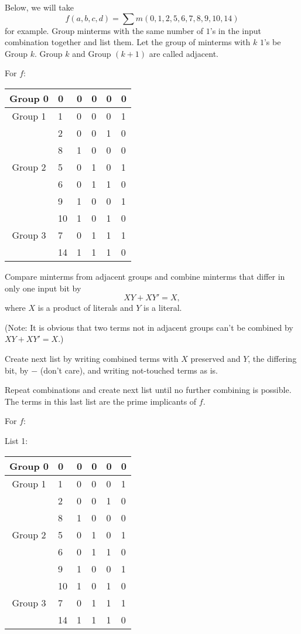\documentclass[a4paper,12pt]{article}
\begin{document}
\begin{itemize}
\begin{itemize}
\begin{itemize}
\begin{itemize}
\begin{itemize}
\begin{itemize}
\begin{itemize}
Below, we will take
\[f(a,b,c,d)=\sum m(0,1,2,5,6,7,8,9,10,14)\]
for example.
Group minterms with the same number of $1$'s in the input combination together and list them. Let the group of minterms with $k$ $1$'s be Group $k$. Group $k$ and Group $(k+1)$ are called adjacent.

For $f$:
\begin{longtable}[c]{|c|m|mmmm|}
\hline
Group 0 & 0 & 0 & 0 & 0 & 0 \\\hline
Group 1 & 1 & 0 & 0 & 0 & 1 \\\cline{2-6}
& 2 & 0 & 0 & 1 & 0 \\\cline{2-6}
& 8 & 1 & 0 & 0 & 0 \\\hline
Group 2 & 5 & 0 & 1 & 0 & 1 \\\cline{2-6}
& 6 & 0 & 1 & 1 & 0 \\\cline{2-6}
& 9 & 1 & 0 & 0 & 1 \\\cline{2-6}
& 10 & 1 & 0 & 1 & 0 \\\hline
Group 3 & 7 & 0 & 1 & 1 & 1 \\\cline{2-6}
& 14 & 1 & 1 & 1 & 0 \\\hline
\end{longtable}
Compare minterms from adjacent groups and combine minterms that differ in only one input bit by
\[XY+XY'=X,\]
where $X$ is a product of literals and $Y$ is a literal.

(Note: It is obvious that two terms not in adjacent groups can't be combined by $XY+XY'=X$.)

Create next list by writing combined terms with $X$ preserved and $Y$, the differing bit, by $-$ (don't care), and writing not-touched terms as is.

Repeat combinations and create next list until no further combining is possible. The terms in this last list are the prime implicants of $f$.

For $f$:

List 1:
\begin{longtable}[c]{|c|m|mmmm|}
\hline
Group 0 & 0 & 0 & 0 & 0 & 0 \\\hline
Group 1 & 1 & 0 & 0 & 0 & 1 \\\cline{2-6}
& 2 & 0 & 0 & 1 & 0 \\\cline{2-6}
& 8 & 1 & 0 & 0 & 0 \\\hline
Group 2 & 5 & 0 & 1 & 0 & 1 \\\cline{2-6}
& 6 & 0 & 1 & 1 & 0 \\\cline{2-6}
& 9 & 1 & 0 & 0 & 1 \\\cline{2-6}
& 10 & 1 & 0 & 1 & 0 \\\hline
Group 3 & 7 & 0 & 1 & 1 & 1 \\\cline{2-6}
& 14 & 1 & 1 & 1 & 0 \\\hline
\end{longtable}


\end{itemize}
\end{itemize}
\end{itemize}
\end{itemize}
\end{itemize}
\end{itemize}
\end{itemize}
\end{document}
